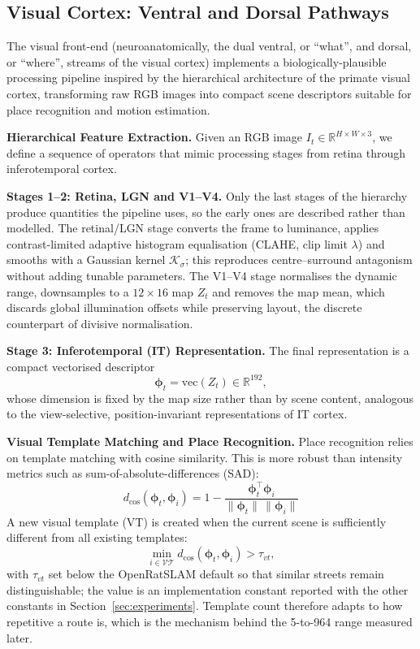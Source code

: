 \subsection{Visual Cortex: Ventral and Dorsal Pathways}
\label{sec:visual_cortex}

The visual front-end (neuroanatomically, the dual ventral, or ``what'', and dorsal, or ``where'', streams of the visual cortex) implements a biologically-plausible processing pipeline inspired by the hierarchical architecture of the primate visual cortex, transforming raw RGB images into compact scene descriptors suitable for place recognition and motion estimation.

\textbf{Hierarchical Feature Extraction.} Given an RGB image $I_t\in\mathbb{R}^{H\times W\times 3}$, we define a sequence of operators that mimic processing stages from retina through inferotemporal cortex.

\textbf{Stages 1--2: Retina, LGN and V1--V4.} Only the last stages of the hierarchy produce quantities the pipeline uses, so the early ones are described rather than modelled. The retinal/LGN stage converts the frame to luminance, applies contrast-limited adaptive histogram equalisation (CLAHE, clip limit $\lambda$) and smooths with a Gaussian kernel $\mathcal{K}_\sigma$; this reproduces centre--surround antagonism without adding tunable parameters. The V1--V4 stage normalises the dynamic range, downsamples to a $12\times16$ map $Z_t$ and removes the map mean, which discards global illumination offsets while preserving layout, the discrete counterpart of divisive normalisation.

\textbf{Stage 3: Inferotemporal (IT) Representation.} The final representation is a compact vectorised descriptor
\begin{equation}
    \boldsymbol{\phi}_t=\mathrm{vec}(Z_t)\in\mathbb{R}^{192},
\end{equation}
whose dimension is fixed by the map size rather than by scene content, analogous to the view-selective, position-invariant representations of IT cortex.

\textbf{Visual Template Matching and Place Recognition.} Place recognition relies on template matching with cosine similarity. This is more robust than intensity metrics such as sum-of-absolute-differences (SAD):
\begin{equation}
    d_{\cos}(\boldsymbol{\phi}_t,\boldsymbol{\phi}_i)=1-\frac{\boldsymbol{\phi}_t^\top\boldsymbol{\phi}_i}{\lVert\boldsymbol{\phi}_t\rVert\,\lVert\boldsymbol{\phi}_i\rVert}
\end{equation}
A new visual template (VT) is created when the current scene is sufficiently different from all existing templates:
\begin{equation}
    \min_{i \in \mathcal{VT}} d_{\cos}(\boldsymbol{\phi}_t, \boldsymbol{\phi}_i)>\tau_{vt},
\end{equation}
with $\tau_{vt}$ set below the OpenRatSLAM default so that similar streets remain distinguishable; the value is an implementation constant reported with the other constants in Section~\ref{sec:experiments}. Template count therefore adapts to how repetitive a route is, which is the mechanism behind the 5-to-964 range measured later.

